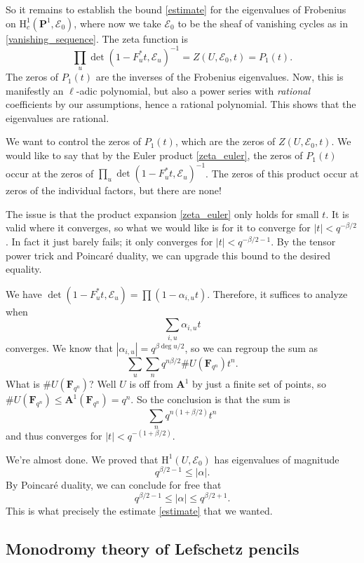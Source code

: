 \documentclass[letterpaper,11pt]{article}
\newcommand{\F}{\mathbf{F}}
\newcommand{\PS}{\mathbf{P}}
\newcommand{\Cal}[1]{\mathcal{#1}}
\newcommand{\A}{\mathbf{A}}
\newcommand{\mrm}[1]{\mathrm{#1}}
\begin{document}
So it remains to establish the bound \eqref{estimate} for the eigenvalues of Frobenius on $\mrm{H}_c^1(\PS^1, \Cal{E}_0)$, where now we take $\Cal{E}_0$ to be the sheaf of vanishing cycles as in \eqref{vanishing_sequence}. The zeta function is 
\begin{equation}\label{zeta_euler}
\prod_u \det (1-F_u^*t, \Cal{E}_u)^{-1} = Z(U, \Cal{E}_0, t) = P_1(t).
\end{equation}
The zeros of $P_1(t)$ are the inverses of the Frobenius eigenvalues. Now, this is manifestly an $\ell$-adic polynomial, but also a power series with \emph{rational} coefficients by our assumptions, hence a rational polynomial. This shows that the eigenvalues are rational. 

We want to control the zeros of $P_1(t)$, which are the zeros of $Z(U, \Cal{E}_0, t)$. We would like to say that by the Euler product \eqref{zeta_euler}, the zeros of $P_1(t)$ occur at the zeros of $\prod_u \det (1-F_u^*t, \Cal{E}_u)^{-1}$. The zeros of this product occur at zeros of the individual factors, but there are none! 

The issue is that the product expansion \eqref{zeta_euler} only holds for small $t$. It is valid where it converges, so what we would like is for it to converge for $|t| < q^{-\beta/2}$. In fact it just barely fails; it only converges for $|t|<q^{-\beta/2-1}$. By the tensor power trick and Poincar\'{e} duality, we can upgrade this bound to the desired equality. 

We have $\det (1-F_u^*t, \Cal{E}_u) = \prod (1-\alpha_{i,u} t)$. Therefore, it suffices to analyze when 
\[
\sum_{i,u} \alpha_{i,u} t
\]
converges. We know that $|\alpha_{i,u}| = q^{\beta \deg u/2}$, so we can regroup the sum as 
\[
\sum_u \sum_n q^{n\beta /2} \#U(\F_{q^n}) t^n.
\]
What is $\#U(\F_{q^n})$? Well $U$ is off from $\A^1$ by just a finite set of points, so $\# U(\F_{q^n}) \leq \A^1(\F_{q^n}) = q^n$. So the conclusion is that the sum is 
\[
\sum_n q^{n(1+\beta/2)} t^n
\]
and thus converges for $|t|<q^{-(1+\beta/2)}$. 

We're almost done. We proved that $\mrm{H}^1(U, \Cal{E}_0)$ has eigenvalues of magnitude
\[
q^{\beta/2-1} \leq |\alpha|.
\]
By Poincar\'{e} duality, we can conclude for free that 
\[
q^{\beta/2-1} \leq |\alpha| \leq q^{\beta/2+1}.
\]
This is what precisely the estimate \eqref{estimate} that we wanted. 


\subsection{Monodromy theory of Lefschetz pencils}\label{Lefschetz_pencil}
\end{document}
